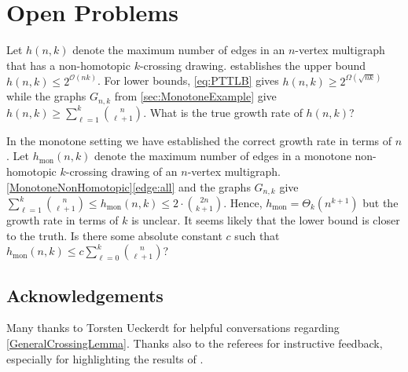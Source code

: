 \documentclass[a4paper,11pt]{article}
\newcommand{\OO}{\mathcal{O}}
\begin{document}
\section{Open Problems} \label{sec:conc}

Let $h(n, k)$ denote the maximum number of edges in an $n$-vertex multigraph that has a non-homotopic $k$-crossing drawing.  establishes the upper bound $h(n, k) \leqslant 2^{\OO(nk)}$. For lower bounds, \eqref{eq:PTTLB} gives $h(n, k) \geqslant 2^{\Omega(\sqrt{nk})}$ while the graphs $G_{n, k}$ from \cref{sec:MonotoneExample} give $h(n, k) \geqslant \sum_{\ell = 1}^k \binom{n}{\ell + 1}$. What is the true growth rate of $h(n, k)$?

In the monotone setting we have established the correct growth rate in terms of $n$. Let $h_\text{mon}(n, k)$ denote the maximum number of edges in a monotone non-homotopic $k$-crossing drawing of an $n$-vertex multigraph. \cref{MonotoneNonHomotopic}\ref{edge:all} and the graphs $G_{n, k}$ give $\sum_{\ell = 1}^k \binom{n}{\ell + 1} \leqslant h_\text{mon}(n, k) \leqslant 2 \cdot \binom{2n}{k + 1}$. Hence, $h_{\text{mon}} = \Theta_k(n^{k + 1})$ but the growth rate in terms of $k$ is unclear. It seems likely that the lower bound is closer to the truth. Is there some absolute constant $c$ such that $h_{\text{mon}}(n, k) \leqslant c \sum_{\ell = 0}^k \binom{n}{\ell + 1}$?

\subsection*{Acknowledgements} 
Many thanks to Torsten Ueckerdt for helpful conversations regarding \cref{GeneralCrossingLemma}. Thanks also to the referees for instructive feedback, especially for highlighting the results of \citet{Przytycki15}.
\end{document}
